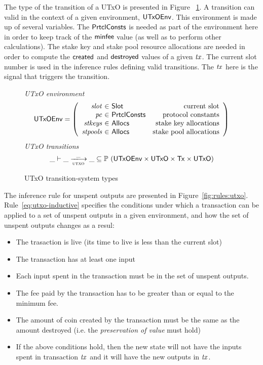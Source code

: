\documentclass[11pt,a4paper]{article}
\newcommand{\Tx}{\type{Tx}}
\newcommand{\UTxO}{\type{UTxO}}
\newcommand{\PrtclConsts}{\type{PrtclConsts}}
\newcommand{\Slot}{\type{Slot}}
\newcommand{\Allocs}{\type{Allocs}}
\newcommand{\UTxOEnv}{\type{UTxOEnv}}
\theoremstyle{definition}
\theoremstyle{definition}
\begin{document}
The type of the transition of a UTxO is presented in Figure
~\ref{fig:ts-types:utxo}. A
transition can valid in the context of a given environment, $\UTxOEnv$.
This environment is made up of several variables.
The $\PrtclConsts$ is needed as part of the environment here in order to
keep track of the $\mathsf{minfee}$ value (as well as
to perform other calculations). The stake key and stake pool resource allocations
are needed in order to compute the $\mathsf{created}$ and
$\mathsf{destroyed}$ values of a given $\mathit{tx}$. The current slot number
is used in the inference rules defining valid transitions.
The $\mathit{tx}$ here is the
signal that triggers the transition.


\begin{figure}
  \emph{UTxO environment}
  \begin{equation*}
    \UTxOEnv =
    \left(
      \begin{array}{r@{~\in~}lr}
        \var{slot} & \Slot & \text{current slot}\\
        \var{pc} & \PrtclConsts & \text{protocol constants}\\
        \var{stkeys} & \Allocs & \text{stake key allocations}\\
        \var{stpools} & \Allocs & \text{stake pool allocations}\\
      \end{array}
    \right)
  \end{equation*}
  \emph{UTxO transitions}
  \begin{equation*}
    \_ \vdash
    \var{\_} \trans{utxo}{\_} \var{\_}
    \subseteq \powerset (\UTxOEnv \times \UTxO \times \Tx \times \UTxO)
  \end{equation*}
  \caption{UTxO transition-system types}
  \label{fig:ts-types:utxo}
\end{figure}


The inference rule for unspent outputs are presented in
Figure~\ref{fig:rules:utxo}.
Rule~\ref{eq:utxo-inductive} specifies the conditions under which a transaction can
be applied to a set of unspent outputs in a given environment, and how the set
of unspent outputs changes as a resul:

\begin{itemize}
\item The trasaction is live (its time to live is less than the current slot)
\item The transaction has at least one input
\item Each input spent in the transaction must be in the set of unspent
  outputs.
\item The fee paid by the transaction has to be greater than or equal to the
minimum fee.
\item The amount of coin created by the transaction must be the same as
the amount destroyed (i.e. the \textit{preservation of value} must hold)
\item If the above conditions hold, then the new state will not have the inputs
  spent in transaction $\mathit{tx}$ and it will have the new outputs in
  $\mathit{tx}$.
\end{itemize}
\end{document}
